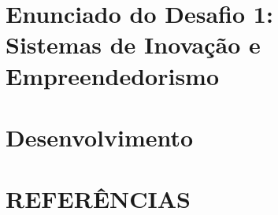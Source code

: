 





\section{Enunciado do Desafio 1: \\ Sistemas de Inovação e Empreendedorismo}


\section{Desenvolvimento}






\section{REFERÊNCIAS}



